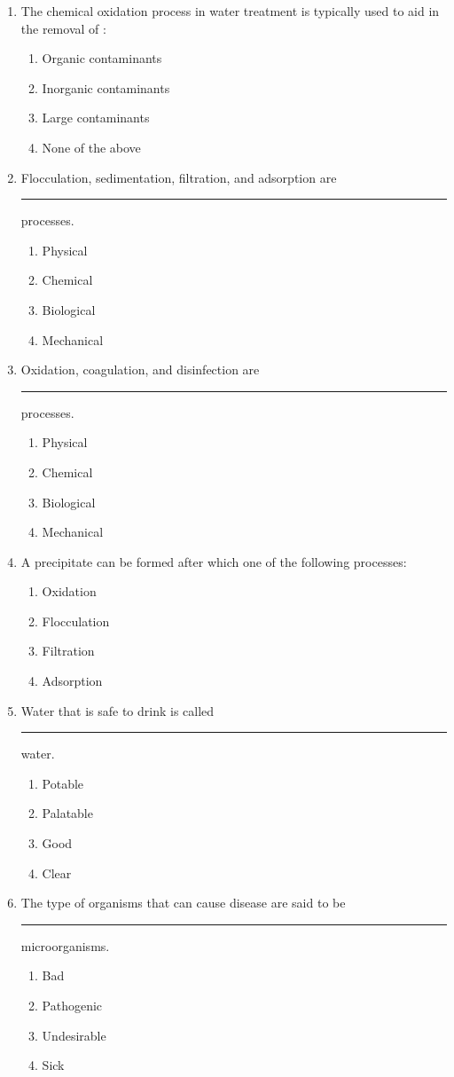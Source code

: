 \documentclass{article}
\begin{document}
\begin{enumerate}
\item The chemical oxidation process in water treatment is typically used to aid in the
removal of :
\begin{enumerate}
\item Organic contaminants
\item Inorganic contaminants
\item Large contaminants
\item None of the above
\end{enumerate}

\item Flocculation, sedimentation, filtration, and adsorption are \rule{2cm}{0.3pt}
processes.
\begin{enumerate}
\item Physical
\item Chemical
\item Biological
\item Mechanical
\end{enumerate}

\item Oxidation, coagulation, and disinfection are \rule{2cm}{0.3pt} processes.
\begin{enumerate}
\item Physical
\item Chemical
\item Biological
\item Mechanical
\end{enumerate}

\item A precipitate can be formed after which one of the following processes:
\begin{enumerate}
\item Oxidation
\item Flocculation
\item Filtration
\item Adsorption
\end{enumerate}

\item Water that is safe to drink is called \rule{1cm}{0.5pt}  water.
\begin{enumerate}
\item Potable
\item Palatable
\item Good
\item Clear
\end{enumerate}

\item The type of organisms that can cause disease are said to be \rule{1cm}{0.5pt} microorganisms.
\begin{enumerate}
\item Bad
\item Pathogenic
\item Undesirable
\item Sick
\end{enumerate}


\end{enumerate}
\end{document}
